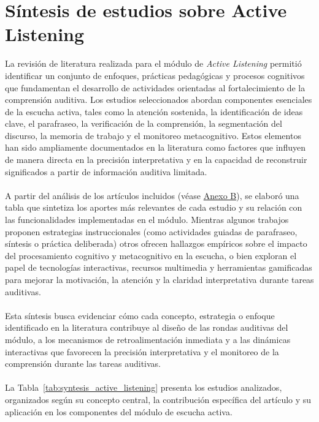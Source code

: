 \section{Síntesis de estudios sobre Active Listening}
La revisión de literatura realizada para el módulo de \textit{Active Listening} permitió identificar un conjunto de enfoques, prácticas pedagógicas y procesos cognitivos que fundamentan el desarrollo de actividades orientadas al fortalecimiento de la comprensión auditiva. Los estudios seleccionados abordan componentes esenciales de la escucha activa, tales como la atención sostenida, la identificación de ideas clave, el parafraseo, la verificación de la comprensión, la segmentación del discurso, la memoria de trabajo y el monitoreo metacognitivo. Estos elementos han sido ampliamente documentados en la literatura como factores que influyen de manera directa en la precisión interpretativa y en la capacidad de reconstruir significados a partir de información auditiva limitada.
\\
\\
A partir del análisis de los artículos incluidos (véase \hyperref[anexo:active_listening]{Anexo B}), se elaboró una tabla que sintetiza los aportes más relevantes de cada estudio y su relación con las funcionalidades implementadas en el módulo. Mientras algunos trabajos proponen estrategias instruccionales (como actividades guiadas de parafraseo, síntesis o práctica deliberada) otros ofrecen hallazgos empíricos sobre el impacto del procesamiento cognitivo y metacognitivo en la escucha, o bien exploran el papel de tecnologías interactivas, recursos multimedia y herramientas gamificadas para mejorar la motivación, la atención y la claridad interpretativa durante tareas auditivas.
\\
\\
Esta síntesis busca evidenciar cómo cada concepto, estrategia o enfoque identificado en la literatura contribuye al diseño de las rondas auditivas del módulo, a los mecanismos de retroalimentación inmediata y a las dinámicas interactivas que favorecen la precisión interpretativa y el monitoreo de la comprensión durante las tareas auditivas.
\\
\\
La Tabla~\ref{tab:syntesis_active_listening} presenta los estudios analizados, organizados según su concepto central, la contribución específica del artículo y su aplicación en los componentes del módulo de escucha activa.

